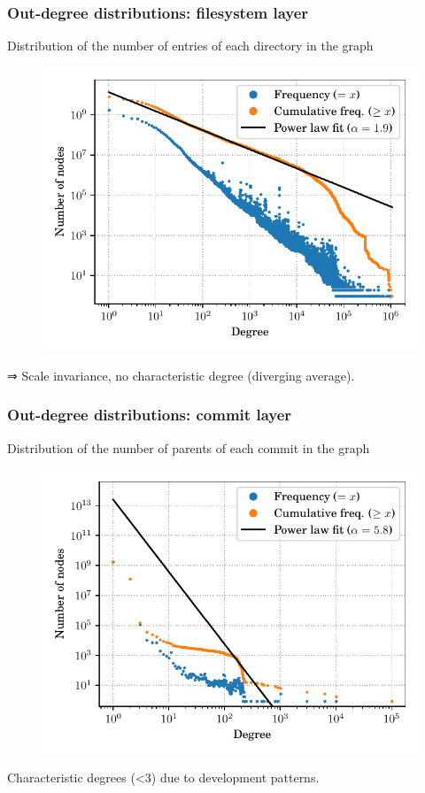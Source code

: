 \documentclass[aspectratio=169,xcolor=table]{beamer}
\begin{document}
    \begin{frame}
        \frametitle{Out-degree distributions: filesystem layer}

        \begin{block}{}
            Distribution of the number of entries of each directory in the
            graph
        \end{block}

        \begin{figure}
            \centering
            \includegraphics[width=0.5\linewidth]{../img/topology/inout/dir+cnt_out}
        \end{figure}

        \begin{block}{}
            ⇒ Scale invariance, no characteristic degree (diverging average).
        \end{block}
    \end{frame}

    \begin{frame}
        \frametitle{Out-degree distributions: commit layer}
        \begin{block}{}
            Distribution of the number of parents of each commit in the graph
        \end{block}

        \begin{figure}
            \centering
            \includegraphics[width=0.5\linewidth]{../img/topology/inout/rev_out}
        \end{figure}

        \begin{block}{}
            Characteristic degrees (<3) due to development patterns.
        \end{block}
    \end{frame}
\end{document}
